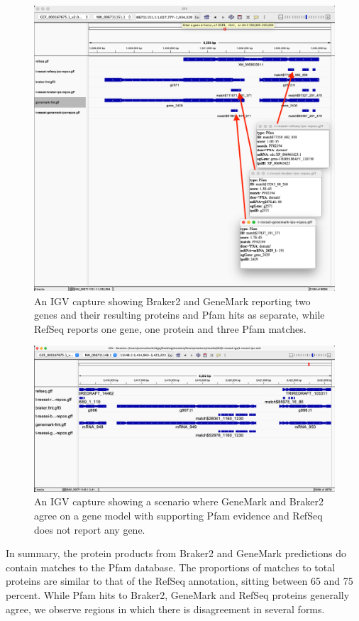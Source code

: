 \begin{figure}[h!]
  \centering
  \includegraphics[width=\textwidth]{figures/igv/ips-model-disagree2.png}
  \caption[Split Pfam matches]{An IGV capture showing Braker2 and
    GeneMark reporting two genes and their resulting proteins and
    Pfam hits as separate, while RefSeq reports one gene, one protein
    and three Pfam matches.}\label{fig:agree-bizarre2}
\end{figure}

\begin{figure}
  \centering
  \includegraphics[width=\textwidth]{figures/igv/ips-braker-genemark-norefseq.png}
  \caption[RefSeq absence with IPS evidence]{An IGV capture showing a
    scenario where GeneMark and Braker2 agree on a gene model with
    supporting Pfam evidence and RefSeq does not report any gene.}\label{fig:ips-no-refseq}
\end{figure}

In summary, the protein products from Braker2 and GeneMark predictions
do contain matches to the Pfam database. The proportions of matches to
total proteins are similar to that of the RefSeq annotation, sitting
between 65 and 75 percent. While Pfam hits to Braker2, GeneMark and
RefSeq proteins generally agree, we observe regions in which there
is disagreement in several forms.

